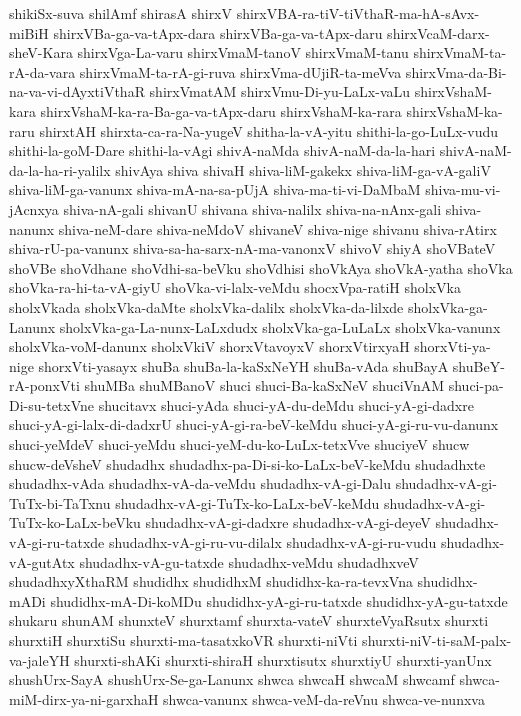 {shikiSx-suva
shilAmf
shirasA
shirxV
shirxVBA-ra-tiV-tiVthaR-ma-hA-sAvx-miBiH
shirxVBa-ga-va-tApx-dara
shirxVBa-ga-va-tApx-daru
shirxVcaM-darx-sheV-Kara
shirxVga-La-varu
shirxVmaM-tanoV
shirxVmaM-tanu
shirxVmaM-ta-rA-da-vara
shirxVmaM-ta-rA-gi-ruva
shirxVma-dUjiR-ta-meVva
shirxVma-da-Bi-na-va-vi-dAyxtiVthaR
shirxVmatAM
shirxVmu-Di-yu-LaLx-vaLu
shirxVshaM-kara
shirxVshaM-ka-ra-Ba-ga-va-tApx-daru
shirxVshaM-ka-rara
shirxVshaM-ka-raru
shirxtAH
shirxta-ca-ra-Na-yugeV
shitha-la-vA-yitu
shithi-la-go-LuLx-vudu
shithi-la-goM-Dare
shithi-la-vAgi
shivA-naMda
shivA-naM-da-la-hari
shivA-naM-da-la-ha-ri-yalilx
shivAya
shiva
shivaH
shiva-liM-gakekx
shiva-liM-ga-vA-galiV
shiva-liM-ga-vanunx
shiva-mA-na-sa-pUjA
shiva-ma-ti-vi-DaMbaM
shiva-mu-vi-jAcnxya
shiva-nA-gali
shivanU
shivana
shiva-nalilx
shiva-na-nAnx-gali
shiva-nanunx
shiva-neM-dare
shiva-neMdoV
shivaneV
shiva-nige
shivanu
shiva-rAtirx
shiva-rU-pa-vanunx
shiva-sa-ha-sarx-nA-ma-vanonxV
shivoV
shiyA
shoVBateV
shoVBe
shoVdhane
shoVdhi-sa-beVku
shoVdhisi
shoVkAya
shoVkA-yatha
shoVka
shoVka-ra-hi-ta-vA-giyU
shoVka-vi-lalx-veMdu
shocxVpa-ratiH
sholxVka
sholxVkada
sholxVka-daMte
sholxVka-dalilx
sholxVka-da-lilxde
sholxVka-ga-Lanunx
sholxVka-ga-La-nunx-LaLxdudx
sholxVka-ga-LuLaLx
sholxVka-vanunx
sholxVka-voM-danunx
sholxVkiV
shorxVtavoyxV
shorxVtirxyaH
shorxVti-ya-nige
shorxVti-yasayx
shuBa
shuBa-la-kaSxNeYH
shuBa-vAda
shuBayA
shuBeY-rA-ponxVti
shuMBa
shuMBanoV
shuci
shuci-Ba-kaSxNeV
shuciVnAM
shuci-pa-Di-su-tetxVne
shucitavx
shuci-yAda
shuci-yA-du-deMdu
shuci-yA-gi-dadxre
shuci-yA-gi-lalx-di-dadxrU
shuci-yA-gi-ra-beV-keMdu
shuci-yA-gi-ru-vu-danunx
shuci-yeMdeV
shuci-yeMdu
shuci-yeM-du-ko-LuLx-tetxVve
shuciyeV
shucw
shucw-deVsheV
shudadhx
shudadhx-pa-Di-si-ko-LaLx-beV-keMdu
shudadhxte
shudadhx-vAda
shudadhx-vA-da-veMdu
shudadhx-vA-gi-Dalu
shudadhx-vA-gi-TuTx-bi-TaTxnu
shudadhx-vA-gi-TuTx-ko-LaLx-beV-keMdu
shudadhx-vA-gi-TuTx-ko-LaLx-beVku
shudadhx-vA-gi-dadxre
shudadhx-vA-gi-deyeV
shudadhx-vA-gi-ru-tatxde
shudadhx-vA-gi-ru-vu-dilalx
shudadhx-vA-gi-ru-vudu
shudadhx-vA-gutAtx
shudadhx-vA-gu-tatxde
shudadhx-veMdu
shudadhxveV
shudadhxyXthaRM
shudidhx
shudidhxM
shudidhx-ka-ra-tevxVna
shudidhx-mADi
shudidhx-mA-Di-koMDu
shudidhx-yA-gi-ru-tatxde
shudidhx-yA-gu-tatxde
shukaru
shunAM
shunxteV
shurxtamf
shurxta-vateV
shurxteVyaRsutx
shurxti
shurxtiH
shurxtiSu
shurxti-ma-tasatxkoVR
shurxti-niVti
shurxti-niV-ti-saM-palx-va-jaleYH
shurxti-shAKi
shurxti-shiraH
shurxtisutx
shurxtiyU
shurxti-yanUnx
shushUrx-SayA
shushUrx-Se-ga-Lanunx
shwca
shwcaH
shwcaM
shwcamf
shwca-miM-dirx-ya-ni-garxhaH
shwca-vanunx
shwca-veM-da-reVnu
shwca-ve-nunxva
}
